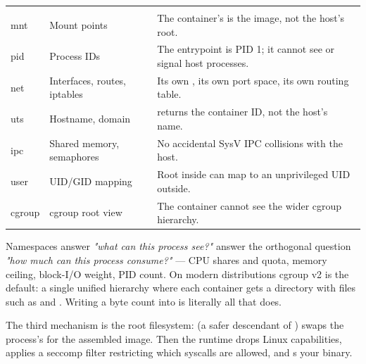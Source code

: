 \begin{center}\small
\wbrowcolors
\begin{tabularx}{\linewidth}{@{}L{22mm} L{26mm} X@{}}
 &  & \\
mnt & Mount points & The container's \code{/} is the image, not the host's root.\\
pid & Process IDs & The entrypoint is PID 1; it cannot see or signal host processes.\\
net & Interfaces, routes, iptables & Its own , its own port space, its own routing table.\\
uts & Hostname, domain &  returns the container ID, not the host's name.\\
ipc & Shared memory, semaphores & No accidental SysV IPC collisions with the host.\\
user & UID/GID mapping & Root inside can map to an unprivileged UID outside.\\
cgroup & cgroup root view & The container cannot see the wider cgroup hierarchy.\\
\end{tabularx}
\end{center}

Namespaces answer \emph{"what can this process see?"}  answer the orthogonal question \emph{"how much can this process consume?"} --- CPU shares and quota, memory ceiling, block-I/O weight, PID count. On modern distributions cgroup v2 is the default: a single unified hierarchy where each container gets a directory with files such as  and . Writing a byte count into  is literally all that  does.

The third mechanism is the root filesystem:  (a safer descendant of ) swaps the process's \code{/} for the assembled image. Then the runtime drops Linux capabilities, applies a seccomp filter restricting which syscalls are allowed, and s your binary.

